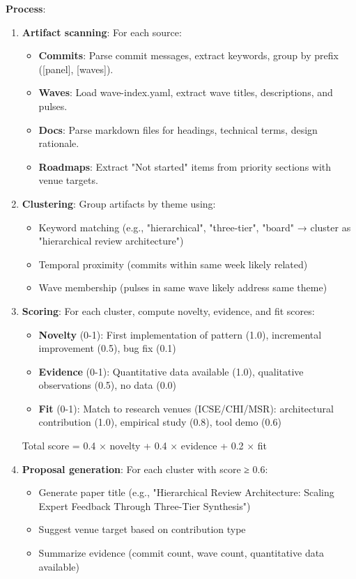 \textbf{Process}:
\begin{enumerate}
\item \textbf{Artifact scanning}: For each source:
  \begin{itemize}
  \item \textbf{Commits}: Parse commit messages, extract keywords, group by prefix ([panel], [waves]).
  \item \textbf{Waves}: Load wave-index.yaml, extract wave titles, descriptions, and pulses.
  \item \textbf{Docs}: Parse markdown files for headings, technical terms, design rationale.
  \item \textbf{Roadmaps}: Extract "Not started" items from priority sections with venue targets.
  \end{itemize}

\item \textbf{Clustering}: Group artifacts by theme using:
  \begin{itemize}
  \item Keyword matching (e.g., "hierarchical", "three-tier", "board" → cluster as "hierarchical review architecture")
  \item Temporal proximity (commits within same week likely related)
  \item Wave membership (pulses in same wave likely address same theme)
  \end{itemize}

\item \textbf{Scoring}: For each cluster, compute novelty, evidence, and fit scores:
  \begin{itemize}
  \item \textbf{Novelty} (0-1): First implementation of pattern (1.0), incremental improvement (0.5), bug fix (0.1)
  \item \textbf{Evidence} (0-1): Quantitative data available (1.0), qualitative observations (0.5), no data (0.0)
  \item \textbf{Fit} (0-1): Match to research venues (ICSE/CHI/MSR): architectural contribution (1.0), empirical study (0.8), tool demo (0.6)
  \end{itemize}
  Total score = 0.4 × novelty + 0.4 × evidence + 0.2 × fit

\item \textbf{Proposal generation}: For each cluster with score ≥ 0.6:
  \begin{itemize}
  \item Generate paper title (e.g., "Hierarchical Review Architecture: Scaling Expert Feedback Through Three-Tier Synthesis")
  \item Suggest venue target based on contribution type
  \item Summarize evidence (commit count, wave count, quantitative data available)
  \end{itemize}
\end{enumerate}

